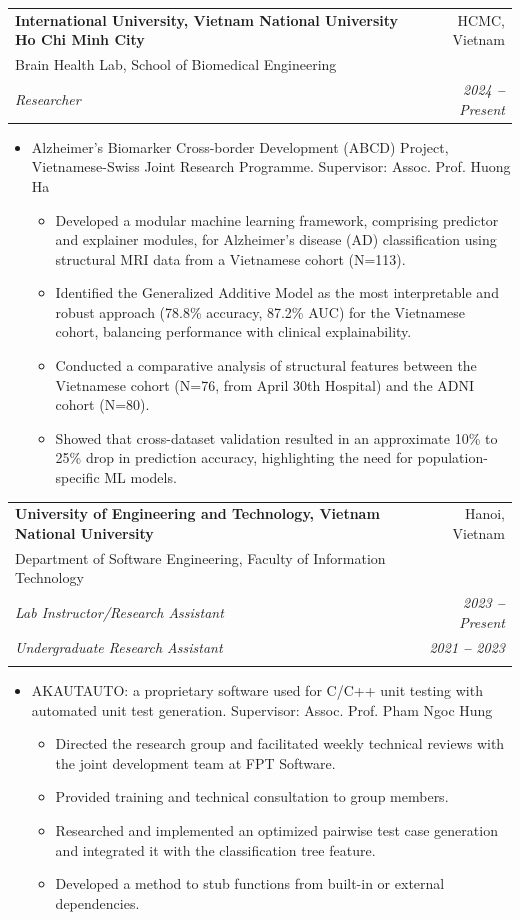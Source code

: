 \documentclass[letterpaper,11pt]{article}
\makeatletter
\newcommand{\resumeSubheadingTriple}[5]{%
  \vspace{-2pt}\item
  \begin{tabular*}{0.97\textwidth}[t]{l@{\extracolsep{\fill}}r}
    \textbf{#1} & #2 \\
    \small #3   &    \\
    \textit{\small#4} & \textit{\small #5} \\
  \end{tabular*}\vspace{-7pt}%
}
\newcommand{\resumeSubheadingQuad}[9]{%
  \vspace{-2pt}\item
  \begin{tabular*}{0.97\textwidth}[t]{l@{\extracolsep{\fill}}r}
    \textbf{#1} & #2 \\
    \small #3   &    \\
    \textit{\small#4} & \textit{\small #5} \\
    \textit{\small#6} & \textit{\small #7} \\
    \textit{\small#8} & \textit{\small #9} \\
  \end{tabular*}\vspace{-7pt}%
}
\newcommand{\resumeItem}[1]{%
  \item\small{{#1 \vspace{-2pt}}}%
}
\newcommand{\resumeItemListStart}{\begin{itemize}}
\newcommand{\resumeItemListEnd}{\end{itemize}\vspace{-5pt}}
\makeatother
\begin{document}
\resumeSubheadingTriple
{International University, Vietnam National University Ho Chi Minh City}{HCMC, Vietnam}
{Brain Health Lab, School of Biomedical Engineering}
{Researcher}{2024 \textbf{--} Present}
\resumeItemListStart
\resumeItem{Alzheimer's Biomarker Cross-border Development (ABCD) Project, Vietnamese-Swiss Joint Research Programme. Supervisor: Assoc. Prof. Huong Ha}
\begin{itemize}
  \item Developed a modular machine learning framework, comprising predictor and explainer modules, for Alzheimer's disease (AD) classification using structural MRI data from a Vietnamese cohort (N=113).
  \item Identified the Generalized Additive Model as the most interpretable and robust approach (78.8\% accuracy, 87.2\% AUC) for the Vietnamese cohort, balancing performance with clinical explainability.
  \item Conducted a comparative analysis of structural features between the Vietnamese cohort (N=76, from April 30th Hospital) and the ADNI cohort (N=80).
  \item Showed that cross-dataset validation resulted in an approximate 10\% to 25\% drop in prediction accuracy, highlighting the need for population-specific ML models.
\end{itemize}
\resumeItemListEnd

\resumeSubheadingQuad
{University of Engineering and Technology, Vietnam National University}{Hanoi, Vietnam}
{Department of Software Engineering, Faculty of Information Technology}
{Lab Instructor/Research Assistant}{2023 \textbf{--} Present}
{Undergraduate Research Assistant}{2021 \textbf{--} 2023}
{}{}
\vspace{-1.5em}
\resumeItemListStart
\resumeItem{AKAUTAUTO: a proprietary software used for C/C++ unit testing with automated unit test generation. Supervisor: Assoc. Prof. Pham Ngoc Hung}
\begin{itemize}
  \item Directed the research group and facilitated weekly technical reviews with the joint development team at FPT Software.
  \item Provided training and technical consultation to group members.
  \item Researched and implemented an optimized pairwise test case generation and integrated it with the classification tree feature.
  \item Developed a method to stub functions from built-in or external dependencies.
\end{itemize}
\resumeItemListEnd
\end{document}
